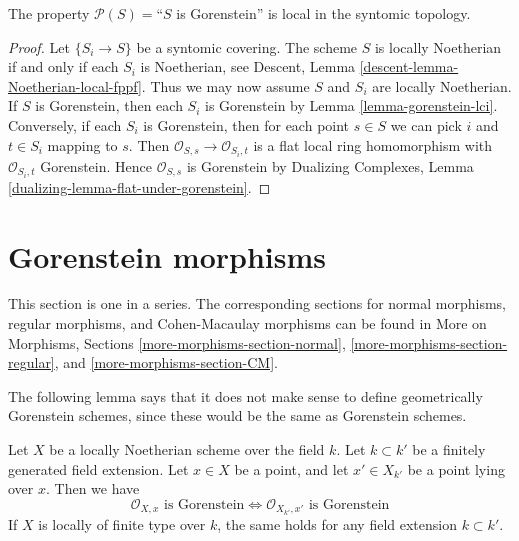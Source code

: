 \begin{lemma}
\label{lemma-gorenstein-local-syntomic}
The property $\mathcal{P}(S) =$``$S$ is Gorenstein''
is local in the syntomic topology.
\end{lemma}

\begin{proof}
Let $\{S_i \to S\}$ be a syntomic covering. The scheme $S$ is locally
Noetherian if and only if each $S_i$ is Noetherian, see
Descent, Lemma \ref{descent-lemma-Noetherian-local-fppf}.
Thus we may now assume $S$ and $S_i$ are locally Noetherian.
If $S$ is Gorenstein, then
each $S_i$ is Gorenstein by Lemma \ref{lemma-gorenstein-lci}.
Conversely, if each $S_i$ is Gorenstein, then for each point
$s \in S$ we can pick $i$ and $t \in S_i$ mapping to $s$.
Then $\mathcal{O}_{S, s} \to \mathcal{O}_{S_i, t}$
is a flat local ring homomorphism with $\mathcal{O}_{S_i, t}$
Gorenstein. Hence $\mathcal{O}_{S, s}$ is Gorenstein by
Dualizing Complexes, Lemma \ref{dualizing-lemma-flat-under-gorenstein}.
\end{proof}






\section{Gorenstein morphisms}
\label{section-gorenstein-morphisms}

\noindent
This section is one in a series. The corresponding sections for
normal morphisms,
regular morphisms, and
Cohen-Macaulay morphisms
can be found in More on Morphisms, Sections
\ref{more-morphisms-section-normal},
\ref{more-morphisms-section-regular}, and
\ref{more-morphisms-section-CM}.

\medskip\noindent
The following lemma says that it does not make sense to define
geometrically Gorenstein schemes, since these would be the
same as Gorenstein schemes.

\begin{lemma}
\label{lemma-gorenstein-base-change}
Let $X$ be a locally Noetherian scheme over the field $k$.
Let $k \subset k'$ be a finitely generated field extension.
Let $x \in X$ be a point, and let $x' \in X_{k'}$ be a point lying
over $x$. Then we have
$$
\mathcal{O}_{X, x}\text{ is Gorenstein}
\Leftrightarrow
\mathcal{O}_{X_{k'}, x'}\text{ is Gorenstein}
$$
If $X$ is locally of finite type over $k$, the same holds for any
field extension $k \subset k'$.
\end{lemma}

